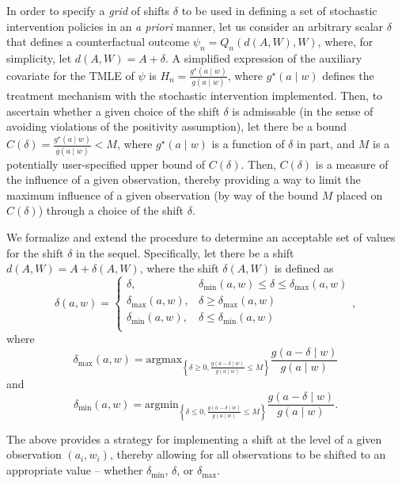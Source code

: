 \documentclass[12pt, krantz2,]{krantz}
\theoremstyle{definition}
\theoremstyle{definition}
\theoremstyle{definition}
\newcommand{\1}{\mathbbm{1}}
\begin{document}
In order to specify a \emph{grid} of shifts \(\delta\) to be used in defining a set of
stochastic intervention policies in an \emph{a priori} manner, let us consider an
arbitrary scalar \(\delta\) that defines a counterfactual outcome \(\psi_n = Q_n(d(A, W), W)\), where, for simplicity, let \(d(A, W) = A + \delta\). A
simplified expression of the auxiliary covariate for the TMLE of \(\psi\) is
\(H_n = \frac{g^{\star}(a \mid w)}{g(a \mid w)}\), where \(g^{\star}(a \mid w)\)
defines the treatment mechanism with the stochastic intervention implemented.
Then, to ascertain whether a given choice of the shift \(\delta\) is admissable
(in the sense of avoiding violations of the positivity assumption), let there
be a bound \(C(\delta) = \frac{g^{\star}(a \mid w)}{g(a \mid w)} < M\), where
\(g^{\star}(a \mid w)\) is a function of \(\delta\) in part, and \(M\) is a potentially
user-specified upper bound of \(C(\delta)\). Then, \(C(\delta)\) is a measure of
the influence of a given observation, thereby providing a way to limit the
maximum influence of a given observation (by way of the bound \(M\) placed on
\(C(\delta)\)) through a choice of the shift \(\delta\).

We formalize and extend the procedure to determine an acceptable set of values
for the shift \(\delta\) in the sequel. Specifically, let there be a shift \(d(A, W) = A + \delta(A, W)\), where the shift \(\delta(A, W)\) is defined as
\begin{equation}
  \delta(a, w) =
    \begin{cases}
      \delta, & \delta_{\text{min}}(a,w) \leq \delta \leq
        \delta_{\text{max}}(a,w) \\
      \delta_{\text{max}}(a,w), & \delta \geq \delta_{\text{max}}(a,w) \\
      \delta_{\text{min}}(a,w), & \delta \leq \delta_{\text{min}}(a,w) \\
    \end{cases},
\end{equation}
where \[\delta_{\text{max}}(a, w) = \text{argmax}_{\left\{\delta \geq 0,
\frac{g(a - \delta \mid w)}{g(a \mid w)} \leq M \right\}} \frac{g(a - \delta
\mid w)}{g(a \mid w)}\] and
\[\delta_{\text{min}}(a, w) = \text{argmin}_{\left\{\delta \leq 0,
\frac{g(a - \delta \mid w)}{g(a \mid w)} \leq M \right\}} \frac{g(a - \delta
\mid w)}{g(a \mid w)}.\]

The above provides a strategy for implementing a shift at the level of a given
observation \((a_i, w_i)\), thereby allowing for all observations to be shifted
to an appropriate value -- whether \(\delta_{\text{min}}\), \(\delta\), or
\(\delta_{\text{max}}\).
\end{document}
